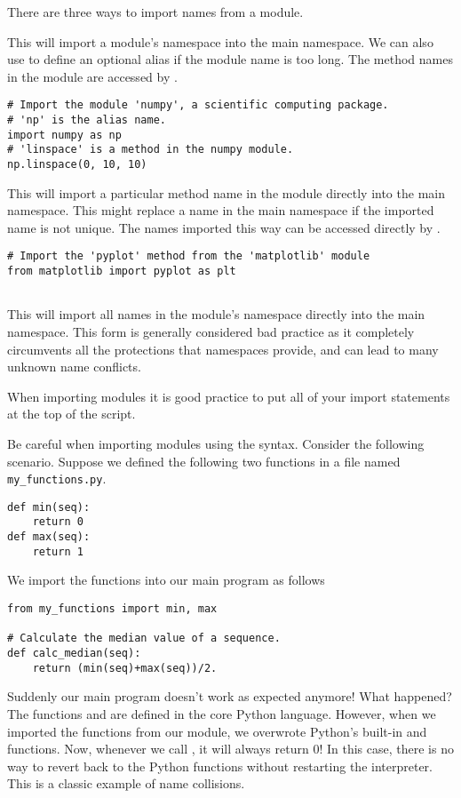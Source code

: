 There are three ways to import names from a module.
\begin{description}
\item {} This will import a module's namespace into the main namespace.
We can also use  to define an optional alias if the module name is too long.
The method names in the module are accessed by .
\begin{lstlisting}
# Import the module 'numpy', a scientific computing package.
# 'np' is the alias name.
import numpy as np
# 'linspace' is a method in the numpy module.
np.linspace(0, 10, 10)
\end{lstlisting}

\item {} This will import a particular method name in the module directly into the main namespace.
This might replace a name in the main namespace if the imported name is not unique.
The names imported this way can be accessed directly by .

\begin{lstlisting}
# Import the 'pyplot' method from the 'matplotlib' module
from matplotlib import pyplot as plt


\end{lstlisting}
\item {} This will import all names in the module's namespace directly into the main namespace.
This form is generally considered bad practice as it completely circumvents all the protections that namespaces provide, and can lead to many unknown name conflicts.
\end{description}

When importing modules it is good practice to put all of your import statements at the top of the script.

\begin{warn}
Be careful when importing modules using the  syntax.
Consider the following scenario.
Suppose we defined the following two functions in a file named \texttt{my\_functions.py}.
\begin{lstlisting}
def min(seq):
    return 0
def max(seq):
    return 1
\end{lstlisting}

We import the functions into our main program as follows
\begin{lstlisting}
from my_functions import min, max

# Calculate the median value of a sequence.
def calc_median(seq):
    return (min(seq)+max(seq))/2.
\end{lstlisting}

Suddenly our main program doesn't work as expected anymore!  What happened?
The functions  and  are defined in the core Python language.
However, when we imported the functions from our module, we overwrote Python's built-in  and  functions.
Now, whenever we call , it will always return 0!
In this case, there is no way to revert back to the Python functions without restarting the interpreter.
This is a classic example of name collisions.
\end{warn}


